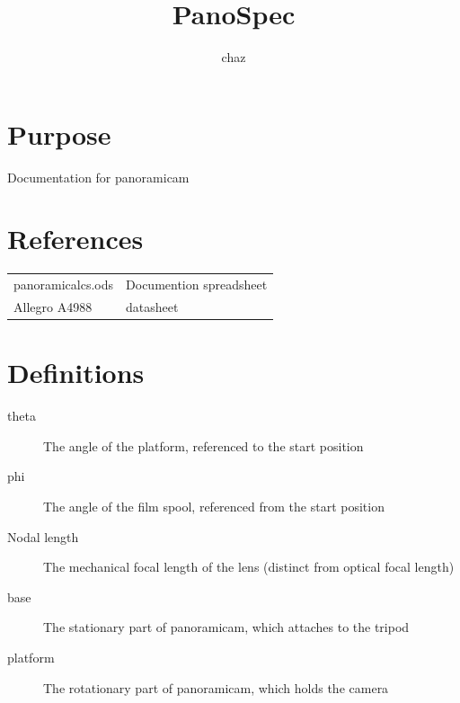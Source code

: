 \documentclass[dvips,12pt]{article}
\title{PanoSpec}
\author{chaz}
\begin{document}

\section{Purpose}
Documentation for panoramicam

\tableofcontents
\listoffigures

\renewcommand{\arraystretch}{1}
\section{References}
\begin{adjustwidth}{2.5em}{0pt}
\begin{tabular}{ l  l }
panoramicalcs.ods & Documention spreadsheet \\
Allegro A4988  & datasheet\\
\end{tabular}
\end{adjustwidth}

\section{Definitions}
\begin{adjustwidth}{2.5em}{0pt}
\begin{description}
    \item[theta] The angle of the platform, referenced to the start position
    \item[phi] The angle of the film spool, referenced from the start position
    \item[Nodal length] The mechanical focal length of the lens (distinct from optical focal length)
    \item[base] The stationary part of panoramicam, which attaches to the tripod
    \item[platform]The rotationary part of panoramicam, which holds the camera
\end{description}
\end{adjustwidth}
\end{document}
